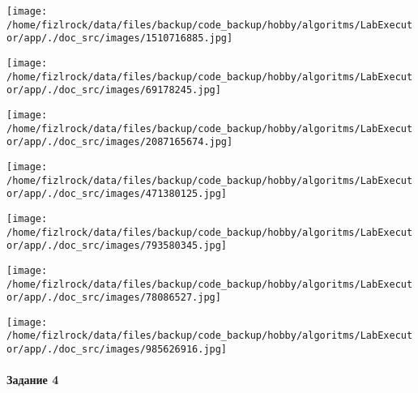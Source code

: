 \documentclass[a4paper, 12pt]{article}
\begin{document}
\texttt{[image: /home/fizlrock/data/files/backup/code\_backup/hobby/algoritms/LabExecutor/app/./doc\_src/images/1510716885.jpg]}

\texttt{[image: /home/fizlrock/data/files/backup/code\_backup/hobby/algoritms/LabExecutor/app/./doc\_src/images/69178245.jpg]}

\texttt{[image: /home/fizlrock/data/files/backup/code\_backup/hobby/algoritms/LabExecutor/app/./doc\_src/images/2087165674.jpg]}

\texttt{[image: /home/fizlrock/data/files/backup/code\_backup/hobby/algoritms/LabExecutor/app/./doc\_src/images/471380125.jpg]}

\texttt{[image: /home/fizlrock/data/files/backup/code\_backup/hobby/algoritms/LabExecutor/app/./doc\_src/images/793580345.jpg]}

\texttt{[image: /home/fizlrock/data/files/backup/code\_backup/hobby/algoritms/LabExecutor/app/./doc\_src/images/78086527.jpg]}

\texttt{[image: /home/fizlrock/data/files/backup/code\_backup/hobby/algoritms/LabExecutor/app/./doc\_src/images/985626916.jpg]}
\pagebreak
\paragraph{Задание 4}
\end{document}
